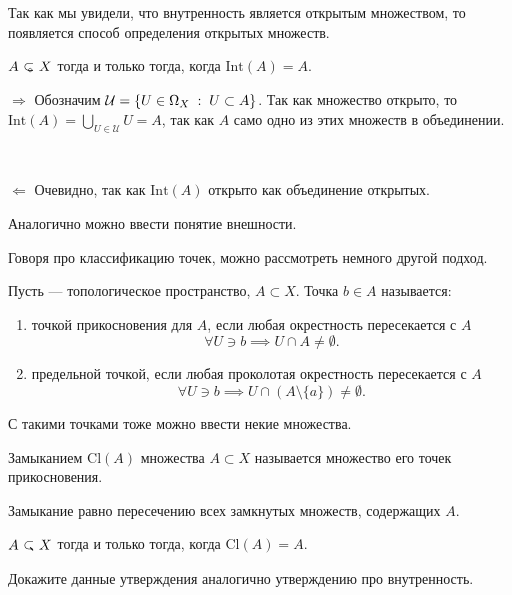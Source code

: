     Так как мы увидели, что внутренность является открытым множеством, то появляется способ определения открытых множеств.
    \begin{Prop}
        $A \open X$ тогда и только тогда, когда $\mathrm{Int} (A) = A$.
    \end{Prop}
    \begin{Proof}
        $\Rightarrow$ Обозначим $\mathcal{U} = \{ U \in \Omega_X \; : \; U\subset A\}$. Так как множество открыто, то $\mathrm{Int} (A) = \bigcup\limits_{U \in \mathcal{U}}{U} = A$, так как $A$ само одно из этих множеств в объединении.
        
        \

        \noindent $\Leftarrow$ Очевидно, так как $\mathrm{Int} (A)$ открыто как объединение открытых.
    \end{Proof}

    Аналогично можно ввести понятие внешности. 

    Говоря про классификацию точек, можно рассмотреть немного другой подход. 
    \begin{Def}
        Пусть \topX --- топологическое пространство,  $A \subset X$. Точка $b\in A$ называется:
        \begin{enumerate}
            \item точкой прикосновения для $A$, если любая окрестность пересекается с $A$
                \[
                \forall U \ni b \implies U \cap A \neq \emptyset.
                \] 
            \item предельной точкой, если любая проколотая окрестность пересекается с $A$
                \[
                    \forall U \ni b \implies U \cap (A \setminus \{a\}) \neq \emptyset.
                \] 
        \end{enumerate}
    \end{Def}
    С такими точками тоже можно ввести некие множества.
    \begin{Def}
        Замыканием $\mathrm{Cl}(A)$ множества $A \subset X$ называется множество его точек прикосновения.
    \end{Def}
    \begin{Prop}
        Замыкание равно пересечению всех замкнутых множеств, содержащих $A$.
    \end{Prop}

    \begin{Prop}
        $A \closed X$ тогда и только тогда, когда $\mathrm{Cl}(A) = A$.
    \end{Prop}
    \begin{Task}
        Докажите данные утверждения аналогично утверждению про внутренность.
    \end{Task}

